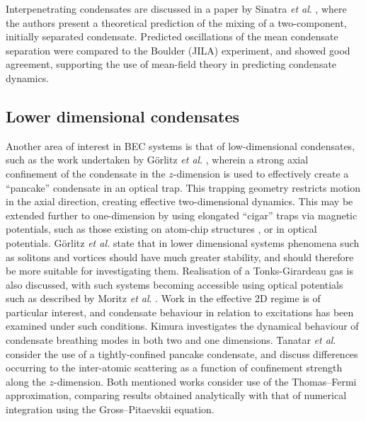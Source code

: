 Interpenetrating condensates are discussed in a paper by Sinatra \textit{et al}. \cite{BEC:Sinatra_prl_1999}, where the authors present a theoretical prediction of the mixing of a two-component, initially separated condensate. Predicted oscillations of the mean condensate separation were compared to the Boulder (JILA) experiment, and showed good agreement, supporting the use of mean-field theory in predicting condensate dynamics.

\subsection{Lower dimensional condensates}\label{sub:coldatom_recent}
Another area of interest in BEC systems is that of low-dimensional condensates, such as the work undertaken by G\"{o}rlitz \textit{et al}. \cite{BEC:Gorlitz_prl_2001}, wherein a strong axial confinement of the condensate in the $z$-dimension is used to effectively create a ``pancake'' condensate in an optical trap. This trapping geometry restricts motion in the axial direction, creating effective two-dimensional dynamics. This may be extended further to one-dimension by using elongated ``cigar'' traps via magnetic potentials, such as those existing on atom-chip structures \cite{AO:Denschlag_prl_1999,AO:Folman_prl_2000,AO:Haase_pra_2001}, or in optical potentials. G\"{o}rlitz \textit{et al.} state that in lower dimensional systems phenomena such as solitons and vortices should have much greater stability, and should therefore be more suitable for investigating them. Realisation of a Tonks-Girardeau gas is also discussed, with such systems becoming accessible using optical potentials such as described by Moritz \textit{et al}. \cite{OL:Moritz_prl_2003}. Work in the effective 2D regime is of particular interest, and condensate behaviour in relation to excitations has been examined under such conditions. Kimura \cite{BEC:Kimura_pra_2002} investigates the dynamical behaviour of condensate breathing modes in both two and one dimensions. Tanatar \textit{et al}. \cite{BEC:Tanatar_arxiv_2002} consider the use of a tightly-confined pancake condensate, and discuss differences occurring to the inter-atomic scattering as a function of confinement strength along the $z$-dimension. Both mentioned works consider use of the Thomas--Fermi approximation, comparing results obtained analytically with that of numerical integration using the Gross--Pitaevskii equation.

\fi
